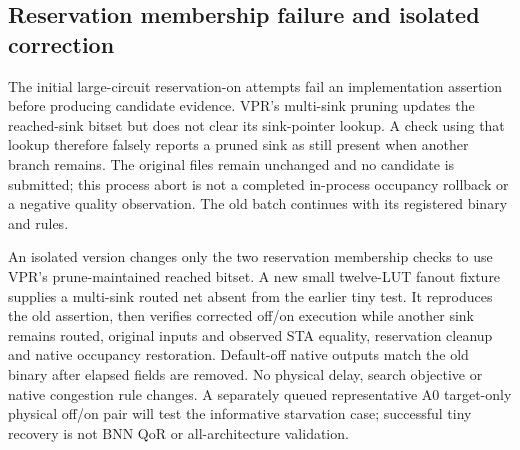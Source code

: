 
\subsection{Reservation membership failure and isolated correction}
The initial large-circuit reservation-on attempts fail an implementation assertion before producing candidate evidence. VPR's multi-sink pruning updates the reached-sink bitset but does not clear its sink-pointer lookup. A check using that lookup therefore falsely reports a pruned sink as still present when another branch remains. The original files remain unchanged and no candidate is submitted; this process abort is not a completed in-process occupancy rollback or a negative quality observation. The old batch continues with its registered binary and rules.

An isolated version changes only the two reservation membership checks to use VPR's prune-maintained reached bitset. A new small twelve-LUT fanout fixture supplies a multi-sink routed net absent from the earlier tiny test. It reproduces the old assertion, then verifies corrected off/on execution while another sink remains routed, original inputs and observed STA equality, reservation cleanup and native occupancy restoration. Default-off native outputs match the old binary after elapsed fields are removed. No physical delay, search objective or native congestion rule changes. A separately queued representative A0 target-only physical off/on pair will test the informative starvation case; successful tiny recovery is not BNN QoR or all-architecture validation.
